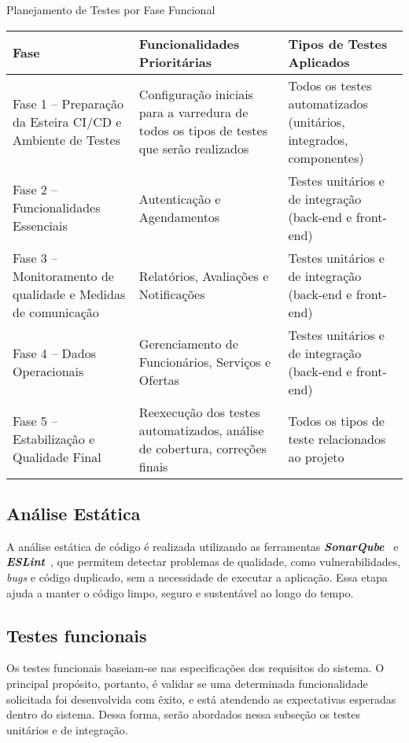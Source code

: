 \begin{quadro}[htbp]
	\centering
	\caption{Planejamento de Testes por Fase Funcional}
	\label{quad:planejamento-testes}
	\begin{tabularx}{\textwidth}{|p{5cm}|X|X|}
		\hline
		\textbf{Fase} & 
		\textbf{Funcionalidades Prioritárias} & 
		\textbf{Tipos de Testes Aplicados} \\
		\hline
		Fase 1 – Preparação da Esteira CI/CD e Ambiente de Testes & 
		Configuração iniciais para a varredura de todos os tipos de testes que serão realizados &
		Todos os testes automatizados (unitários, integrados, componentes)
		\\
		\hline
		Fase 2 – Funcionalidades Essenciais & 
		Autenticação e Agendamentos & 
		Testes unitários e de integração (back-end e front-end) \\
		\hline
		Fase 3 – Monitoramento de qualidade e Medidas de comunicação & 
		Relatórios, Avaliações e Notificações & 
		Testes unitários e de integração (back-end e front-end) \\
		\hline
		Fase 4 – Dados Operacionais & 
		Gerenciamento de Funcionários, Serviços e Ofertas & 
		Testes unitários e de integração (back-end e front-end) \\
		\hline
		Fase 5 – Estabilização e Qualidade Final & 
		Reexecução dos testes automatizados, análise de cobertura, correções finais & 
		Todos os tipos de teste relacionados ao projeto \\
		\hline
	\end{tabularx}
\end{quadro}


\subsection{Análise Estática}
A análise estática de código é realizada utilizando as ferramentas \textbf{\textit{SonarQube}}~\cite{sonarqube-2025} e \textbf{\textit{ESLint}}~\cite{eslint-2025}, 
que permitem detectar problemas de qualidade, como vulnerabilidades, \textit{bugs} e código duplicado, sem a necessidade de executar a aplicação. Essa etapa ajuda a manter o código limpo, seguro e sustentável ao longo do tempo.

\subsection{Testes funcionais}
Os testes funcionais baseiam-se nas especificações dos requisitos do sistema. O principal propósito, portanto, é validar se uma determinada funcionalidade solicitada foi desenvolvida com êxito, e está atendendo as expectativas esperadas dentro do sistema. Dessa forma, serão abordados nessa subseção os testes unitários e de integração.

